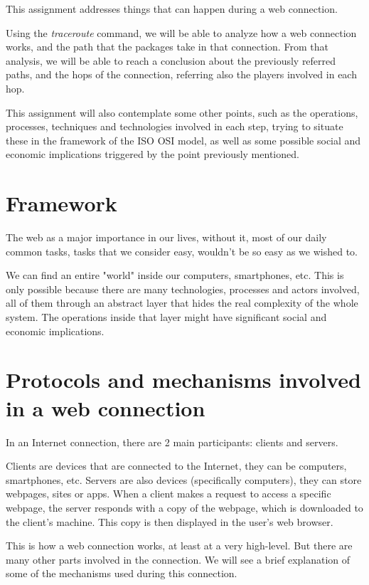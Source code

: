 \documentclass{article}
\newcommand\tab[1][1cm]{\hspace*{#1}}
\begin{document}
\tab This assignment addresses things that can happen during a web connection.

Using the \textit{traceroute} command, we will be able to analyze how a web connection works, and the path that the packages take in that connection.
From that analysis, we will be able to reach a conclusion about the previously referred paths, and the hops of the connection, referring also the players involved in each hop.

This assignment will also contemplate some other points, such as the operations, processes, techniques and technologies involved in each step, trying to situate these in the framework of the ISO OSI model, as well as some possible social and economic implications triggered by the point previously mentioned.

\section{Framework}

The web as a major importance in our lives, without it, most of our daily common tasks, tasks that we consider easy, wouldn't be so easy as we wished to. 

We can find an entire "world" inside our computers, smartphones, etc. This is only possible because there are many technologies, processes and actors involved, all of them through an abstract layer that hides the real complexity of the whole system. The operations inside that layer might have significant social and economic implications.

\section{Protocols and mechanisms involved in a web connection}

\tab In an Internet connection, there are 2 main participants: clients and servers.

Clients are devices that are connected to the Internet, they can be computers, smartphones, etc. Servers are also devices (specifically computers), they can store webpages, sites or apps. 
When a client makes a request to access a specific webpage, the server responds with a copy of the webpage, which is downloaded to the client's machine. This copy is then displayed in the user's web browser.

This is how a web connection works, at least at a very high-level. But there are many other parts involved in the connection. We will see a brief explanation of some of the mechanisms used during this connection.
\end{document}
